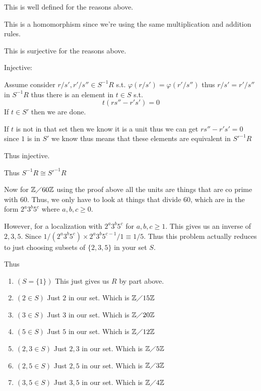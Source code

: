 \documentclass[12pt, letterpaper]{article}
\newcounter{problem}
\newcommand{\Z}{\mathbb{Z}}
\begin{document}
\begin{enumerate}[(a)]
   This is well defined for the reasons above.
   
   This is a homomorphism since we're using the same multiplication and addition rules.

   This is surjective for the reasons above.

   Injective:

   Assume consider $r/s',r'/s'' \in S^{-1}R$ s.t. $\varphi(r/s')=\varphi(r'/s'')$ thus $r/s'=r'/s''$ in $S^{-1}R$ thus there is an element in $t \in S$ s.t.
   \[t(rs''-r's')=0\]
   If $t \in S'$ then we are done.

   If $t$ is not in that set then we know it is a unit thus we can get $rs''-r's'=0$ since $1$ is in $S'$ we know thus means that these elements are equivalent in $S'^{-1}R$

   Thus injective.

   Thus $S^{-1}R \cong S'^{-1}R$

   Now for $\Z \diagup 60\Z$ using the proof above all the units are things that are co prime with $60$. Thus, we only have to look at things that divide 60, which are in the form $2^a3^b5^c$ where $a,b,c \geq 0$.

   However, for a localization with $2^a3^b5^c$ for $a,b,c \geq 1$. This gives us an inverse of $2,3,5$. Since $1/(2^a3^b5^c) \times 2^a3^b5^{c-1}/1 \equiv 1/5$. Thus this problem actually reduces to just choosing subsets of $\{2,3,5\}$ in your set $S$.

   Thus

   \begin{enumerate}[1.]
    \item $(S=\{1\})$ This just gives us $R$ by part above.
    
    \item $(2 \in S)$ Just $2$ in our set. Which is $\Z \diagup 15 \Z$
    
    \item $(3 \in S)$ Just $3$ in our set. Which is $\Z \diagup 20 \Z$
    
    \item $(5 \in S)$ Just $5$ in our set. Which is $\Z \diagup 12 \Z$
    
    \item $(2,3 \in S)$ Just $2,3$ in our set. Which is $\Z \diagup 5 \Z$
    
    \item $(2,5 \in S)$ Just $2,5$ in our set. Which is $\Z \diagup 3 \Z$
    
    \item $(3,5 \in S)$ Just $3,5$ in our set. Which is $\Z \diagup 4 \Z$
    

\end{enumerate}
\end{enumerate}
\end{document}
